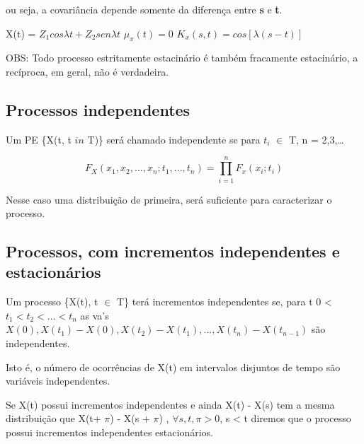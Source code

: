 \documentclass[]{article}
\providecommand{\tightlist}{%
  \setlength{\itemsep}{0pt}\setlength{\parskip}{0pt}}
\theoremstyle{definition}
\theoremstyle{definition}
\theoremstyle{definition}
\theoremstyle{remark}
\let\BeginKnitrBlock\begin \let\EndKnitrBlock\end
\begin{document}

ou seja, a covariância depende somente da diferença entre \textbf{s} e
\textbf{t}.

\BeginKnitrBlock{example}
\protect\hypertarget{exm:unnamed-chunk-18}{}{\label{exm:unnamed-chunk-18}
}X(t) = \(Z_1 cos \lambda t + Z_2 sen \lambda t\) \(\mu_x(t) = 0\)
\(K_x(s,t) = cos[\lambda(s-t)]\)
\EndKnitrBlock{example}

OBS: Todo processo estritamente estacinário é também fracamente
estacinário, a recíproca, em geral, não é verdadeira.

\subsection{Processos independentes}\label{processos-independentes}

Um PE \{X(t, t \(in\) T)\} será chamado independente se para \(t_i\)
\(\in\) T, n = 2,3,\ldots{}

\[F_X(x_1,x_2,...,x_n; t_1,...,t_n) = \prod^n_{i=1} F_x(x_i;t_i)\]

Nesse caso uma distribuição de primeira, será suficiente para
caracterizar o processo.

\subsection{Processos, com incrementos independentes e
estacionários}\label{processos-com-incrementos-independentes-e-estacionarios}

Um processo \{X(t), t \(\in\) T\} terá incrementos independentes se,
para t 0 \textless{} \(t_1 < t_2 < ... < t_n\) as va's
\(X(0),X(t_1) - X(0), X(t_2)-X(t_1),..., X(t_n) - X(t_{n-1})\) são
independentes.

Isto é, o número de ocorrências de X(t) em intervalos disjuntos de tempo
são variáveis independentes.

Se X(t) possui incrementos independentes e ainda X(t) - X(s) tem a mesma
distribuição que X(t+ \(\pi\)) - X(s + \(\pi\)) ,
\(\forall s,t,\pi >0\), s \textless{} t diremos que o processo possui
incrementos independentes estacionários.
\end{document}
